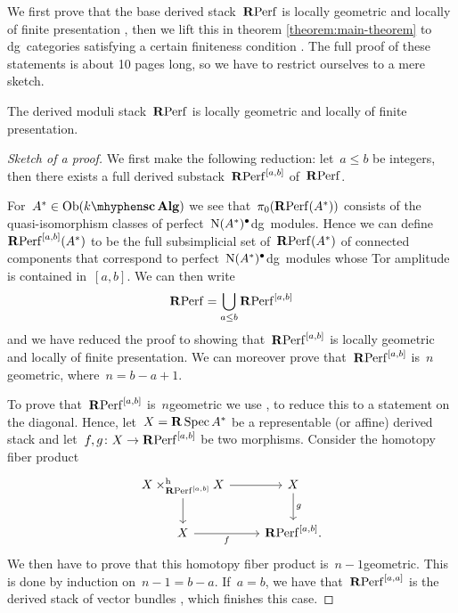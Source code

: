 \begin{refsection}
We first prove that the base derived stack~$\mathbf{R}\mathrm{Perf}$ is locally geometric and locally of finite presentation \cite[proposition 3.7]{toen-vaquie}, then we lift this in theorem \ref{theorem:main-theorem} to dg~categories satisfying a certain finiteness condition \cite[theorem 3.6]{toen-vaquie}. The full proof of these statements is about 10 pages long, so we have to restrict ourselves to a mere sketch.
\begin{theorem}
  \label{theorem:main-theorem-RPerf}
  The derived moduli stack~$\mathbf{R}\mathrm{Perf}$ is locally geometric and locally of finite presentation.

  \begin{proof}[Sketch of a proof]
    We first make the following reduction: let~$a\leq b$ be integers, then there exists a full derived substack~$\mathbf{R}\mathrm{Perf}^{[a,b]}$ of~$\mathbf{R}\mathrm{Perf}$.
    
    For~$A^*\in\Ob(\scAlg{k})$ we see that~$\pi_0(\mathbf{R}\mathrm{Perf}(A^*))$ consists of the quasi-isomorphism classes of perfect~$\operatorname{N}(A^*)^\bullet$\dash dg~modules. Hence we can define~$\mathbf{R}\mathrm{Perf}^{[a,b]}(A^*)$ to be the full subsimplicial set of~$\mathbf{R}\mathrm{Perf}(A^*)$ of connected components that correspond to perfect~$\operatorname{N}(A^*)^\bullet$\dash dg~modules whose Tor amplitude is contained in~$[a,b]$. We can then write
    \begin{equation}
      \mathbf{R}\mathrm{Perf}=\bigcup_{a\leq b}\mathbf{R}\mathrm{Perf}^{[a,b]}
    \end{equation}
    and we have reduced the proof to showing that~$\mathbf{R}\mathrm{Perf}^{[a,b]}$ is locally geometric and locally of finite presentation. We can moreover prove that~$\mathbf{R}\mathrm{Perf}^{[a,b]}$ is~$n$\dash geometric, where~$n=b-a+1$.

    To prove that~$\mathbf{R}\mathrm{Perf}^{[a,b]}$ is~$n$\dash geometric we use \cite[lemma 2.18]{toen-vaquie}, to reduce this to a statement on the diagonal. Hence, let~$X=\mathbf{R}\operatorname{Spec} A^*$ be a representable (or affine) derived stack and let~$f,g\colon X\to\mathbf{R}\mathrm{Perf}^{[a,b]}$ be two morphisms. Consider the homotopy fiber product
    \begin{equation}
      \begin{tikzcd}
        X\times_{\RPerf^{[a,b]}}^{\mathrm{h}}X \arrow{r} \arrow{d} & X \arrow{d}{g} \\
        X \arrow[swap]{r}{f} & \RPerf^{[a,b]}.
      \end{tikzcd}
    \end{equation}
    We then have to prove that this homotopy fiber product is~$n-1$\dash geometric. This is done by induction on~$n-1=b-a$. If~$a=b$, we have that~$\mathbf{R}\mathrm{Perf}^{[a,a]}$ is the derived stack of vector bundles \cite[corollary 1.3.7.4]{hagII}, which finishes this case.


\end{proof}
\end{theorem}
\end{refsection}
